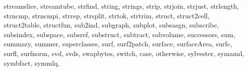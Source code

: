 {{        streamslice,%
        streamtube,%
        strfind,%
        string,%
        strings,%
        strip,%
        strjoin,%
        strjust,%
        strlength,%
        strncmp,%
        strncmpi,%
        strrep,%
        strsplit,%
        strtok,%
        strtrim,%
        struct,%
        struct2cell,%
        struct2table,%
        structfun,%
        sub2ind,%
        subgraph,%
        subplot,%
        subsasgn,%
        subscribe,%
        subsindex,%
        subspace,%
        subsref,%
        substruct,%
        subtract,%
        subvolume,%
        successors,%
        sum,%
        summary,%
        summer,%
        superclasses,%
        surf,%
        surf2patch,%
        surface,%
        surfaceArea,%
        surfc,%
        surfl,%
        surfnorm,%
        svd,%
        svds,%
        swapbytes,%
        switch, case, otherwise,%
        sylvester,%
        symamd,%
        symbfact,%
        symmlq,%
}}

